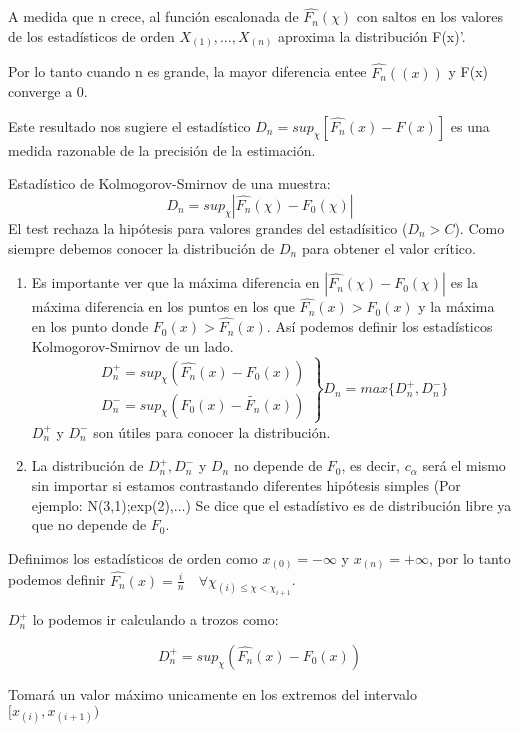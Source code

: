 A medida que n crece, al función escalonada de $\widehat{F_n}(\chi)$ con saltos en los valores de los estadísticos de orden $X_{(1)},\dots,X_{(n)}$ aproxima la distribución F(x)'.

Por lo tanto cuando n es grande, la mayor diferencia entee $\widehat{F_n}((x))$ y F(x) converge a 0.

Este resultado nos sugiere el estadístico $
D_n=sup_\chi[\widehat{F_n}(x)-F(x)]
$ es una medida razonable de la precisión de la estimación.

Estadístico de Kolmogorov-Smirnov de una muestra:
\[
    D_n=sup_\chi|\widehat{F_n}(\chi)-F_0(\chi)|
\]
El test rechaza la hipótesis para valores grandes del estadísitico ($D_n>C$).
Como siempre debemos conocer la distribución de $D_n$ para obtener el valor crítico.

\begin{enumerate}
    \item Es importante ver que la máxima diferencia en $|\widehat{F_n}(\chi)-F_0(\chi)|$ es la máxima 
    diferencia en los puntos en los que $\widehat{F_n}(x)>F_0(x)$ y la máxima en los punto donde $F_0(x)>\widehat{F_n}(x)$. 
    Así podemos definir los estadísticos Kolmogorov-Smirnov de un lado.
    \[
    \left.
    \begin{matrix}
        D_n^+=sup_\chi(\widehat{F_n}(x)-F_0(x)) \\
        D_n^-=sup_\chi(F_0(x)-\widetilde{F_n}(x))
    \end{matrix}
    \right\}
    D_n=max\{D_n^+,D_n^-\}
    \]
    $D_n^+$ y $D_n^-$ son útiles para conocer la distribución.
    \item La distribución de $D_n^+,D_n^-$ y $D_n$ no depende de $F_0$, es decir, $c_\alpha$
    será el mismo sin importar si estamos contrastando diferentes hipótesis simples (Por ejemplo: N(3,1);exp(2),$\dots$)
    Se dice que el estadístivo es de distribución libre ya que no depende de $F_0$.
\end{enumerate}

Definimos los estadísticos de orden como $x_{(0)}=-\infty$ y $x_{(n)}=+\infty$, por lo tanto podemos definir $\widehat{F_n}(x)=\frac{i}{n} \quad \forall \chi_{(i)\leq \chi < \chi_{i+1}}$.

$D_n^+$ lo podemos ir calculando a trozos como:

\[
    D_n^+=sup_\chi(\widehat{F_n}(x)-F_0(x))
\]

Tomará un valor máximo unicamente en los extremos del intervalo $[x_{(i)},x_{(i+1)})$

